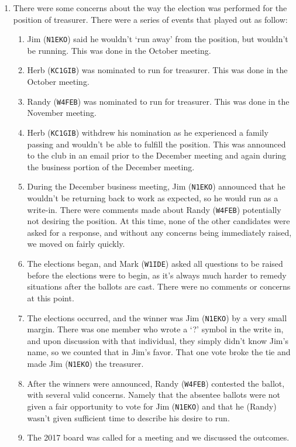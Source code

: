 \documentclass[10pt,letterpaper]{article}
\begin{document}
\begin{enumerate}
  \item There were some concerns about the way the election was performed for the position of treasurer. There were a series of events that played out as follow:
  \begin{enumerate}
    \item Jim (\texttt{N1EKO}) said he wouldn't `run away' from the position, but wouldn't be running. This was done in the October meeting.
    \item Herb (\texttt{KC1GIB}) was nominated to run for treasurer. This was done in the October meeting.
    \item Randy (\texttt{W4FEB}) was nominated to run for treasurer. This was done in the November meeting.
    \item Herb (\texttt{KC1GIB}) withdrew his nomination as he experienced a family passing and wouldn't be able to fulfill the position. This was announced to the club in an email prior to the December meeting and again during the business portion of the December meeting.
    \item During the December business meeting, Jim (\texttt{N1EKO}) announced that he wouldn't be returning back to work as expected, so he would run as a write-in. There were comments made about Randy (\texttt{W4FEB}) potentially not desiring the position. At this time, none of the other candidates were asked for a response, and without any concerns being immediately raised, we moved on fairly quickly.
    \item The elections began, and Mark (\texttt{W1IDE}) asked all questions to be raised before the elections were to begin, as it's always much harder to remedy situations after the ballots are cast. There were no comments or concerns at this point.
    \item The elections occurred, and the winner was Jim (\texttt{N1EKO}) by a very small margin. There was one member who wrote a `?' symbol in the write in, and upon discussion with that individual, they simply didn't know Jim's name, so we counted that in Jim's favor. That one vote broke the tie and made Jim (\texttt{N1EKO}) the treasurer.
    \item After the winners were announced, Randy (\texttt{W4FEB}) contested the ballot, with several valid concerns. Namely that the absentee ballots were not given a fair opportunity to vote for Jim (\texttt{N1EKO}) and that he (Randy) wasn't given sufficient time to describe his desire to run.
    \item The 2017 board was called for a meeting and we discussed the outcomes.

\end{enumerate}
\end{enumerate}
\end{document}
